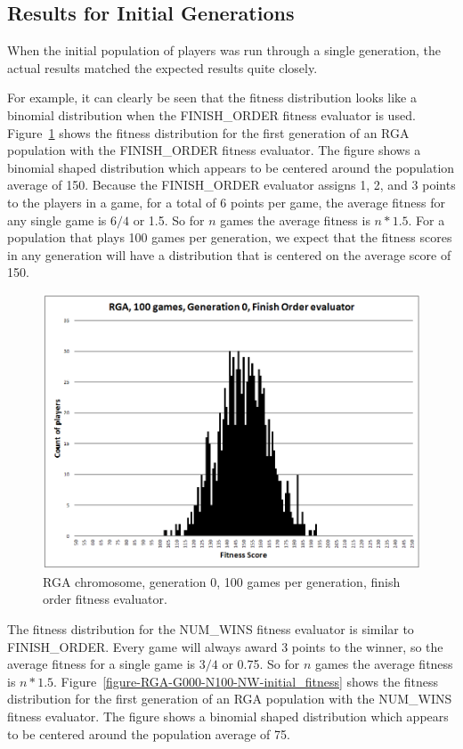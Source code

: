 \subsection{Results for Initial Generations}

When the initial population of players was run through a single generation, the
actual results matched the expected results quite closely. 

For example, it can clearly be seen that the fitness distribution looks like a
binomial distribution when the FINISH\_ORDER fitness evaluator is used.
Figure~\ref{figure-RGA-G000-N100-FO-initial_fitness} shows the fitness
distribution for the first generation of an RGA population with the
FINISH\_ORDER fitness evaluator. The figure shows a binomial shaped distribution
which appears to be centered around the population average of 150. Because the
FINISH\_ORDER evaluator assigns 1, 2, and 3 points to the players in a game, for
a total of 6 points per game, the average fitness for any single game is \(6/4\)
or 1.5. So for \(n\) games the average fitness is \(n * 1.5\).
For a population that plays 100 games per generation, we expect that the fitness
scores in any generation will have a distribution that is centered on the
average score of 150.

\begin{figure}[htbp]
\centerline{\includegraphics[width=0.75\columnwidth]{Figures/RGA_1024_G000_N100_FO.png}}
\caption[RGA Fitness Distribution, Initial Generation]{RGA chromosome,
generation 0, 100 games per generation, finish order fitness evaluator.}
\label{figure-RGA-G000-N100-FO-initial_fitness}
\end{figure}

The fitness distribution for the NUM\_WINS fitness evaluator is similar to
FINISH\_ORDER. Every game will always award 3 points to the winner, so the
average fitness for a single game is \(3/4\) or 0.75. So for \(n\) games the
average fitness is \(n * 1.5\).
Figure~\ref{figure-RGA-G000-N100-NW-initial_fitness} shows the fitness
distribution for the first generation of an RGA population with the NUM\_WINS
fitness evaluator. The figure shows a binomial shaped distribution which appears
to be centered around the population average of 75.

